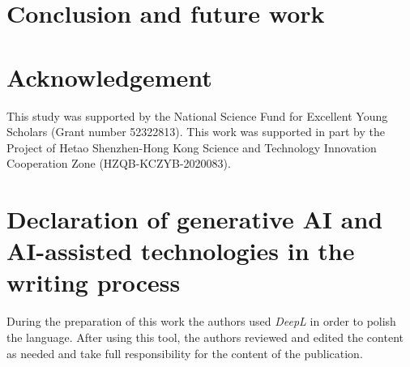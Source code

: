 \section{Conclusion and future work} \label{sec:conclusion}


\iffalse 
In this paper, we investigate the value of building load prediction on microgrid energy management control performance, with an emphasis on the role of demand charge term. The key challenge is to eliminate the cumulative impact of load forecast errors on the control performance of an entire billing cycle. Our proposed ``track-necessary'' approach is easy to implement in practice and demonstrate robustness under forecast errors. Meanwhile, our finding on the asymmetric value of information encourages researchers to consider the learning and optimization problems as a whole in future works. 
\fi

\section{Acknowledgement} \label{sec:acknowledgement}
This study was supported by the National Science Fund for Excellent Young Scholars (Grant number 52322813). This work was supported in part by the Project of Hetao Shenzhen-Hong Kong Science and Technology Innovation Cooperation Zone (HZQB-KCZYB-2020083).

\section{Declaration of generative AI and AI-assisted technologies in the writing process}

During the preparation of this work the authors used \emph{DeepL} in order to polish the language. After using this tool, the authors reviewed and edited the content as needed and take full responsibility for the content of the publication.


% 

 
 